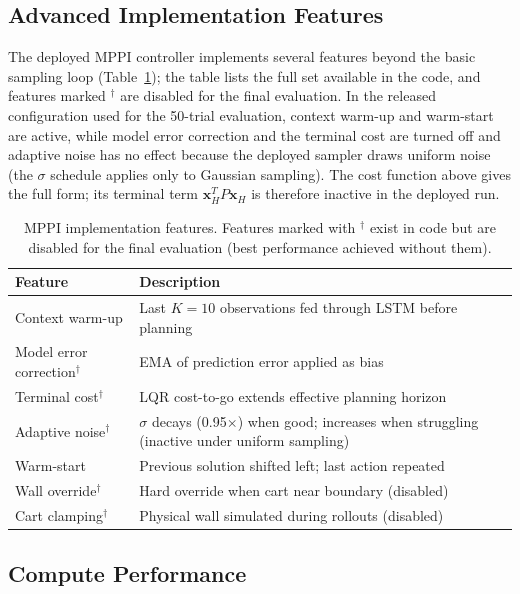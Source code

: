 \subsection{Advanced Implementation Features}

The deployed MPPI controller implements several features beyond the basic
sampling loop (Table~\ref{tab:mppi_features}); the table lists the full set
available in the code, and features marked $^\dagger$ are disabled for the
final evaluation. In the released configuration used for the 50-trial
evaluation, context warm-up and warm-start are active, while model error
correction and the terminal cost are turned off and adaptive noise has no
effect because the deployed sampler draws uniform noise (the $\sigma$
schedule applies only to Gaussian sampling). The cost function above gives
the full form; its terminal term $\mathbf{x}_H^T P \mathbf{x}_H$ is therefore
inactive in the deployed run.

\begin{table}[!ht]
\centering
\caption{MPPI implementation features. Features marked with $^\dagger$ exist
  in code but are disabled for the final evaluation (best performance
  achieved without them).}
\label{tab:mppi_features}
\footnotesize
\setlength{\tabcolsep}{3pt}
\begin{tabular}{lp{}}
\toprule
\textbf{Feature} & \textbf{Description} \\
\midrule
Context warm-up & Last $K=10$ observations fed through LSTM before planning \\
Model error correction$^\dagger$ & EMA of prediction error applied as bias \\
Terminal cost$^\dagger$ & LQR cost-to-go extends effective planning horizon \\
Adaptive noise$^\dagger$ & $\sigma$ decays (0.95$\times$) when good; increases when struggling (inactive under uniform sampling) \\
Warm-start & Previous solution shifted left; last action repeated \\
Wall override$^\dagger$ & Hard override when cart near boundary (disabled) \\
Cart clamping$^\dagger$ & Physical wall simulated during rollouts (disabled) \\
\bottomrule
\end{tabular}
\end{table}

\subsection{Compute Performance}


